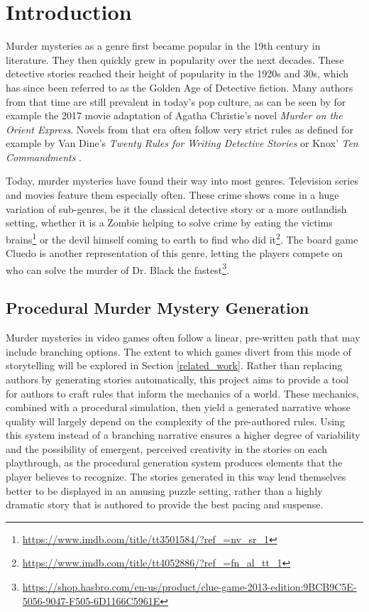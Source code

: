 \section{Introduction} \label{introduction}

Murder mysteries as a genre first became popular in the 19th century in literature.
They then quickly grew in popularity over the next decades.
These detective stories reached their height of popularity in the 1920s and 30s, which has since been referred to as the Golden Age of Detective fiction.
Many authors from that time are still prevalent in today's pop culture, as can be seen by for example the 2017 movie adaptation of Agatha Christie's novel \emph{Murder on the Orient Express}.
Novels from that era often follow very strict rules as defined for example by Van Dine's \emph{Twenty Rules for Writing Detective Stories} \cite{van_dine_1928} or Knox' \emph{Ten Commandments} \cite{knox_1929}.

Today, murder mysteries have found their way into most genres.
Television series and movies feature them especially often.
These crime shows come in a huge variation of sub-genres, be it the classical detective story or a more outlandish setting, whether it is a Zombie helping to solve crime by eating the victims brains\footnote{\url{https://www.imdb.com/title/tt3501584/?ref_=nv_sr_1}} or the devil himself coming to earth to find who did it\footnote{\url{https://www.imdb.com/title/tt4052886/?ref_=fn_al_tt_1}}.
The board game Cluedo is another representation of this genre, letting the players compete on who can solve the murder of Dr. Black the fastest\footnote{\url{https://shop.hasbro.com/en-us/product/clue-game-2013-edition:9BCB9C5E-5056-9047-F505-6D1166C5961E}}.

\subsection{Procedural Murder Mystery Generation}
Murder mysteries in video games often follow a linear, pre-written path that may include branching options.
The extent to which games divert from this mode of storytelling will be explored in Section \ref{related_work}.
Rather than replacing authors by generating stories automatically, this project aims to provide a tool for authors to craft rules that inform the mechanics of a world.
These mechanics, combined with a procedural simulation, then yield a generated narrative whose quality will largely depend on the complexity of the pre-authored rules.
Using this system instead of a branching narrative ensures a higher degree of variability and the possibility of emergent, perceived creativity in the stories on each playthrough, as the procedural generation system produces elements that the player believes to recognize.
The stories generated in this way lend themselves better to be displayed in an amusing puzzle setting, rather than a highly dramatic story that is authored to provide the best pacing and suspense.

